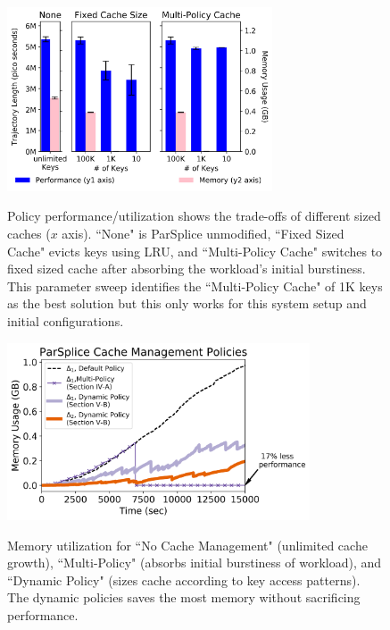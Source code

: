 

\begin{figure}[t]
\centering
\includegraphics[width=0.7\textwidth]{./chapters/controlplane/parsplice/figures/methodology-tradeoff.png}\\
\caption{Policy performance/utilization shows the trade-offs of different sized
caches (\(x\) axis).  ``None" is ParSplice unmodified, ``Fixed Sized Cache"
evicts keys using LRU, and ``Multi-Policy Cache" switches to fixed sized cache
after absorbing the workload's initial burstiness. This parameter sweep
identifies the ``Multi-Policy Cache" of 1K keys as the best solution but this
only works for this system setup and initial configurations.
 \label{fig:methodology-tradeoff}}
\end{figure}

\begin{figure}[t]
        \centering
        \includegraphics[width=0.8\textwidth]{./chapters/controlplane/parsplice/figures/memory-vs-time.png}\\
	\caption{Memory utilization for ``No Cache Management" (unlimited cache
growth), ``Multi-Policy" (absorbs initial burstiness of workload), and
``Dynamic Policy" (sizes cache according to key access patterns). The dynamic
policies saves the most memory without sacrificing performance.
\label{fig:memory-vs-time}}
\end{figure}%
 


